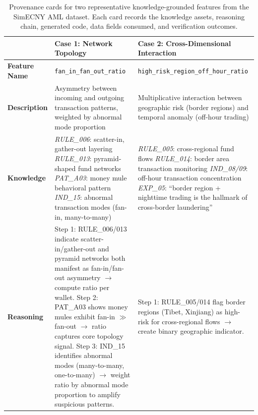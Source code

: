 \begin{table}[!t]
\centering
\caption{Provenance cards for two representative knowledge-grounded features from the SimECNY AML dataset. Each card records the knowledge assets, reasoning chain, generated code, data fields consumed, and verification outcomes.}
\label{tab:provenance}
\small
\renewcommand{\arraystretch}{1.3}
\begin{tabular}{p{2.4cm} p{6.9cm} p{6.9cm}}
\hline
 & \textbf{Case 1: Network Topology} & \textbf{Case 2: Cross-Dimensional Interaction} \\
\hline
\textbf{Feature Name} & \texttt{fan\_in\_fan\_out\_ratio} & \texttt{high\_risk\_region\_off\_hour\_ratio} \\
\hline
\textbf{Description} & Asymmetry between incoming and outgoing transaction patterns, weighted by abnormal mode proportion & Multiplicative interaction between geographic risk (border regions) and temporal anomaly (off-hour trading) \\
\hline
\textbf{Knowledge} &
\textit{RULE\_006}: scatter-in, gather-out layering \newline
\textit{RULE\_013}: pyramid-shaped fund networks \newline
\textit{PAT\_A03}: money mule behavioral pattern \newline
\textit{IND\_15}: abnormal transaction modes (fan-in, many-to-many) &
\textit{RULE\_005}: cross-regional fund flows \newline
\textit{RULE\_014}: border area transaction monitoring \newline
\textit{IND\_08/09}: off-hour transaction concentration \newline
\textit{EXP\_05}: ``border region + nighttime trading is the hallmark of cross-border laundering'' \\
\hline
\textbf{Reasoning} &
Step 1: RULE\_006/013 indicate scatter-in/gather-out and pyramid networks both manifest as fan-in/fan-out asymmetry $\to$ compute ratio per wallet. \newline
Step 2: PAT\_A03 shows money mules exhibit fan-in $\gg$ fan-out $\to$ ratio captures core topology signal. \newline
Step 3: IND\_15 identifies abnormal modes (many-to-many, one-to-many) $\to$ weight ratio by abnormal mode proportion to amplify suspicious patterns. &
Step 1: RULE\_005/014 flag border regions (Tibet, Xinjiang) as high-risk for cross-regional flows $\to$ create binary geographic indicator. \newline

\end{tabular}
\end{table}
